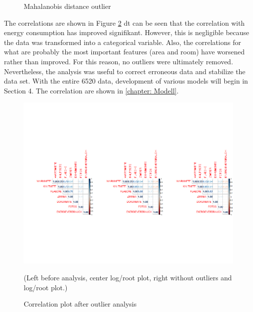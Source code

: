 \begin{figure}[H]
	\caption{Mahalanobis distance outlier}
	\label{fig: Maha Ausreißer}
\end{figure}
The correlations are shown in Figure \ref{fig: Korrelation nach der analyse}  dt can be seen that the correlation with energy consumption has improved signifikant. However, this is negligible because the data was transformed into a categorical variable. Also, the correlations for what are probably the most important features (area and room) have worsened rather than improved. For this reason, no outliers were ultimately removed. Nevertheless, the analysis was useful to correct erroneous data and stabilize the data set. With the entire 6520 data, development of various models will begin in Section 4. The correlation are shown in \ref{chapter: Modell}. 
\begin{figure}[h!]
	\centering
	\includegraphics[width=0.9\linewidth]{img/Korrelation nach der analyse}
	\caption{Correlation plot after outlier analysis}
	\footnotesize\sffamily (Left before analysis, center log/root plot, right without outliers and log/root plot.) 
	\label{fig: Korrelation nach der analyse}
\end{figure}
